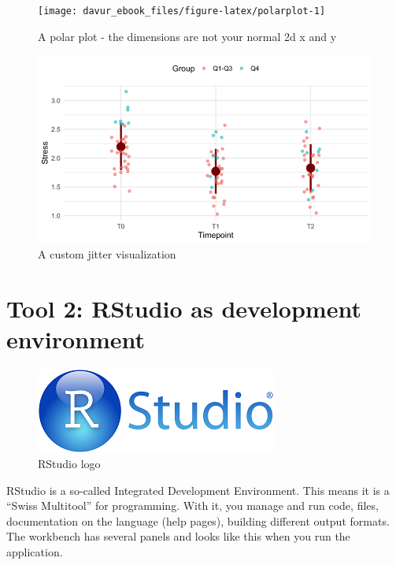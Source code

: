 \documentclass[]{book}
\begin{document}
\begin{figure}

{\centering \texttt{[image: davur\_ebook\_files/figure-latex/polarplot-1]} 

}

\caption{A polar plot - the dimensions are not your normal 2d x and y}\label{fig:polarplot}
\end{figure}

\begin{figure}
\centering
\includegraphics{figures/ptsd-jitter-5-1s.png}
\caption{A custom jitter visualization}
\end{figure}

\hypertarget{tool-2-rstudio-as-development-environment}{%
\section{Tool 2: RStudio as development environment}\label{tool-2-rstudio-as-development-environment}}

\begin{figure}
\centering
\includegraphics{figures/RStudioLogo.png}
\caption{RStudio logo}
\end{figure}

RStudio is a so-called Integrated Development Environment. This means it is a ``Swiss Multitool'' for programming. With it, you manage and run code, files, documentation on the language (help pages), building different output formats.
The workbench has several panels and looks like this when you run the application.
\end{document}
